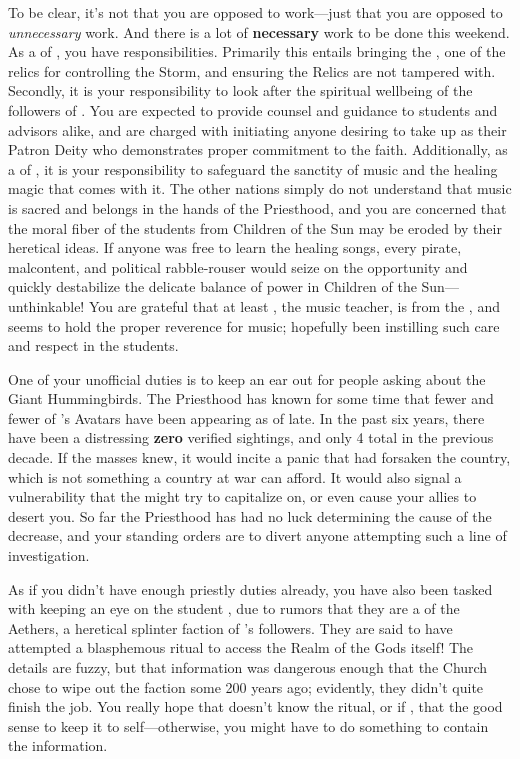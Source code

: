 \documentclass[char]{GL2020}
\begin{document}
To be clear, it's not that you are opposed to work---just that you are opposed to \emph{unnecessary} work. And there is a lot of \textbf{necessary} work to be done this weekend. As a \cHedonist{\cleric} of \cFarmGod{}, you have responsibilities. Primarily this entails bringing the \iPitcher{}, one of the \pFarm{} relics for controlling the Storm, and ensuring the Relics are not tampered with. Secondly, it is your responsibility to look after the spiritual wellbeing of the followers of \cFarmGod{}. You are expected to provide counsel and guidance to students and advisors alike, and are charged with initiating anyone desiring to take up \cFarmGod{} as their Patron Deity who demonstrates proper commitment to the faith. Additionally, as a \cHedonist{\cleric} of 
\cFarmGod{}, it is your responsibility to safeguard the sanctity of music and the healing magic that comes with it. The other nations simply do not understand that music is sacred and belongs in the hands of the Priesthood, and you are concerned that the moral fiber of the students from Children of the Sun may be eroded by their heretical ideas. If anyone was free to learn the healing songs, every pirate, malcontent, and political rabble-rouser would seize on the opportunity and quickly destabilize the delicate balance of power in Children of the Sun---unthinkable! You are grateful that at least \cMusic{\full}, the music teacher, is from the \pFarm{}, and seems to hold the proper reverence for music; hopefully \cMusic{\they} \cMusic{\have} been instilling such care and respect in the students.

One of your unofficial duties is to keep an ear out for people asking about the Giant Hummingbirds. The Priesthood has known for some time that fewer and fewer of \cFarmGod{}'s Avatars have been appearing as of late. In the past six years, there have been a distressing \textbf{zero} verified sightings, and only 4 total in the previous decade. If the masses knew, it would incite a panic that \cFarmGod{} had forsaken the country, which is not something a country at war can afford. It would also signal a vulnerability that the \pShippies{} might try to capitalize on, or even cause your \pTechies{} allies to desert you. So far the Priesthood has had no luck determining the cause of the decrease, and your standing orders are to divert anyone attempting such a line of investigation.

As if you didn't have enough priestly duties already, you have also been tasked with keeping an eye on the student \cDisney{\full}, due to rumors that they are a \cDisney{\cleric} of the Aethers, a heretical splinter faction of \cFarmGod{}'s followers. They are said to have attempted a blasphemous ritual to access the Realm of the Gods itself! The details are fuzzy, but that information was dangerous enough that the Church chose to wipe out the faction some 200 years ago; evidently, they didn't quite finish the job. You really hope that \cDisney{} doesn't know the ritual, or if \cDisney{\they} \cDisney{\does}, that \cDisney{\they} \cDisney{\have} the good sense to keep it to \cDisney{\them}self---otherwise, you might have to do something to contain the information.
\end{document}
